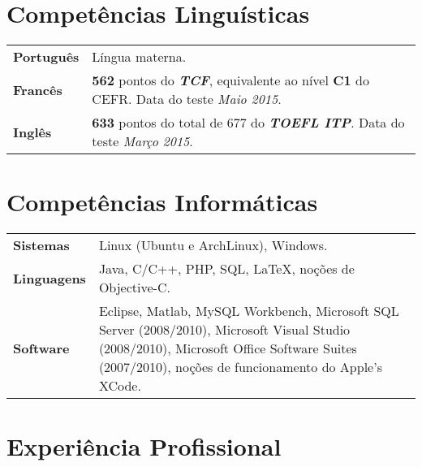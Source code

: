 \documentclass[10pt, a4paper]{article}
\begin{document}



\section{Competências Linguísticas}

\begin{tabular}{p{} p{}}

\textbf{Português} & Língua materna.  \\ 

\textbf{Francês} & \textbf{562} pontos do \textbf{\textit{TCF}},
equivalente ao nível \textbf{C1} do CEFR. Data do teste \textit{Maio
2015}.\\

\textbf{Inglês} & \textbf{633} pontos do total de 677 do \textbf{\textit{TOEFL
ITP}}. Data do teste \textit{Março 2015}. \\  

\end{tabular}


\section{Competências Informáticas} 

\begin{tabular}{p{} p{}}

 \textbf{Sistemas} & Linux (Ubuntu e ArchLinux), Windows.  \\ 

 \textbf{Linguagens} & Java, C/C++, PHP,  SQL, \LaTeX, noções de Objective-C.
 \\
 
 \textbf{Software} & Eclipse, Matlab, MySQL Workbench,  Microsoft SQL Server
 (2008/2010), Microsoft Visual Studio (2008/2010),  Microsoft Office Software
 Suites (2007/2010), noções de funcionamento do Apple’s XCode. \\
\end{tabular}


\section{Experiência Profissional}
\end{document}
